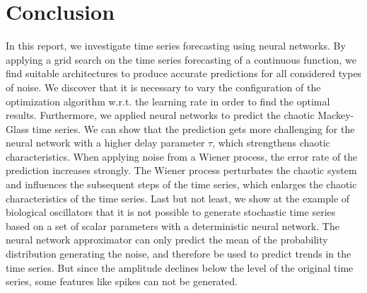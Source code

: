 
\section{Conclusion}

In this report, we investigate time series forecasting using neural networks.
By applying a grid search on the time series forecasting of a continuous 
function, we find suitable architectures to produce accurate predictions for 
all considered types of noise. We discover that it is necessary to vary the 
configuration of the optimization algorithm w.r.t. the learning rate in order 
to find the optimal results. 
Furthermore, we applied neural networks to predict the chaotic 
Mackey-Glass time series. We can show that the prediction gets more challenging
for the neural network with a higher delay parameter $\tau$, which strengthens
chaotic characteristics. When applying noise from a Wiener process, the error
rate of the prediction increases strongly. The
Wiener process perturbates the chaotic system and influences the subsequent
steps of the time series, which enlarges the chaotic characteristics of the 
time series. Last but not least, we show at the example of biological
oscillators that it is not possible to generate stochastic time series based on
a set of scalar parameters with a deterministic neural network. The neural
network approximator can only predict the mean of the probability distribution
generating the noise, and therefore be used to predict trends in the time 
series. But since the amplitude declines below the level of the original time 
series, some features like spikes can not be generated.
